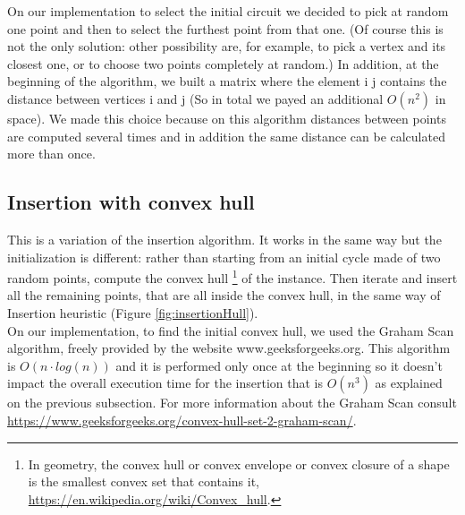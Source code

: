 \noindent On our implementation to select the initial circuit we decided to pick at random one point and then to select the furthest point from that one. (Of course this is not the only solution: other possibility are, for example, to pick a vertex and its closest one, or to choose two points completely at random.) In addition, at the beginning of the algorithm, we built a matrix where the element i j contains the distance between vertices i and j (So in total we payed an additional $O(n^2)$ in space). We made this choice because on this algorithm distances between points are computed several times and in addition the same distance can be calculated more than once.\\


\subsection{Insertion with convex hull}
This is a variation of the insertion algorithm. It works in the same way but the initialization is different: rather than starting from an initial cycle made of two random points, compute the convex hull \footnote{In geometry, the convex hull or convex envelope or convex closure of a shape is the smallest convex set that contains it, \url{https://en.wikipedia.org/wiki/Convex_hull}.
} of the instance. Then iterate and insert all the remaining points, that are all inside the convex hull, in the same way of Insertion heuristic (Figure \ref{fig:insertionHull}).\\
On our implementation, to find the initial convex hull, we used the Graham Scan algorithm, freely provided by the website www.geeksforgeeks.org. This algorithm is $O(n \cdot log(n))$ and it is performed only once at the beginning so it doesn't impact the overall execution time for the insertion that is $O(n^3)$ as explained on the previous subsection. For more information about the Graham Scan consult \url{https://www.geeksforgeeks.org/convex-hull-set-2-graham-scan/}.


